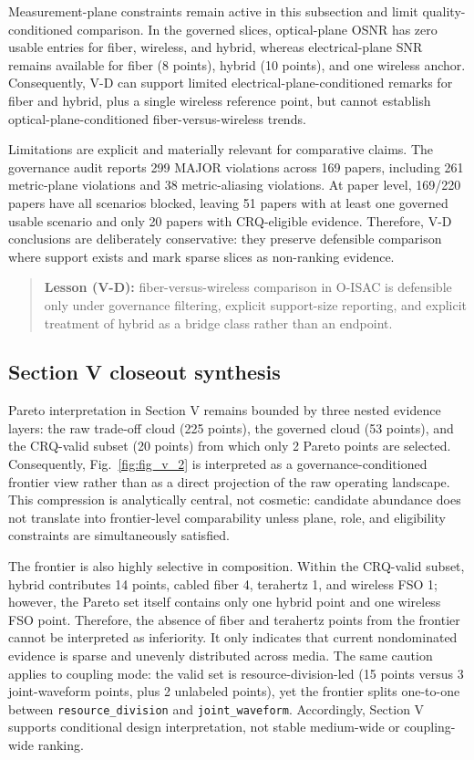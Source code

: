 Measurement-plane constraints remain active in this subsection and limit quality-conditioned comparison. In the governed slices, optical-plane OSNR has zero usable entries for fiber, wireless, and hybrid, whereas electrical-plane SNR remains available for fiber (8 points), hybrid (10 points), and one wireless anchor. Consequently, V-D can support limited electrical-plane-conditioned remarks for fiber and hybrid, plus a single wireless reference point, but cannot establish optical-plane-conditioned fiber-versus-wireless trends.

Limitations are explicit and materially relevant for comparative claims. The governance audit reports 299 MAJOR violations across 169 papers, including 261 metric-plane violations and 38 metric-aliasing violations. At paper level, 169/220 papers have all scenarios blocked, leaving 51 papers with at least one governed usable scenario and only 20 papers with CRQ-eligible evidence. Therefore, V-D conclusions are deliberately conservative: they preserve defensible comparison where support exists and mark sparse slices as non-ranking evidence.

\begin{quote}
\textbf{Lesson (V-D):} fiber-versus-wireless comparison in O-ISAC is defensible only under governance filtering, explicit support-size reporting, and explicit treatment of hybrid as a bridge class rather than an endpoint.
\end{quote}

\subsection*{Section V closeout synthesis}
Pareto interpretation in Section V remains bounded by three nested evidence layers: the raw trade-off cloud (225 points), the governed cloud (53 points), and the CRQ-valid subset (20 points) from which only 2 Pareto points are selected. Consequently, Fig.~\ref{fig:fig_v_2} is interpreted as a governance-conditioned frontier view rather than as a direct projection of the raw operating landscape. This compression is analytically central, not cosmetic: candidate abundance does not translate into frontier-level comparability unless plane, role, and eligibility constraints are simultaneously satisfied.

The frontier is also highly selective in composition. Within the CRQ-valid subset, hybrid contributes 14 points, cabled fiber 4, terahertz 1, and wireless FSO 1; however, the Pareto set itself contains only one hybrid point and one wireless FSO point. Therefore, the absence of fiber and terahertz points from the frontier cannot be interpreted as inferiority. It only indicates that current nondominated evidence is sparse and unevenly distributed across media. The same caution applies to coupling mode: the valid set is resource-division-led (15 points versus 3 joint-waveform points, plus 2 unlabeled points), yet the frontier splits one-to-one between \texttt{resource\_division} and \texttt{joint\_waveform}. Accordingly, Section V supports conditional design interpretation, not stable medium-wide or coupling-wide ranking.

